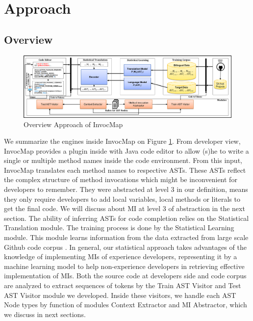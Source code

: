 \section{Approach}
\subsection{Overview}
\begin{figure}[]
 \centering
  \includegraphics[width=\linewidth]{ApproachOverview.png}
  \caption{Overview Approach of InvocMap }
  \label{fig:ApproachOverview}
\end{figure}
We summarize the engines inside InvocMap on Figure \ref{fig:ApproachOverview}. From developer view, InvocMap provides a plugin inside with Java code editor to allow (s)he to write a single or multiple method names inside the code environment. From this input, InvocMap translates each method names to respective ASTs. These ASTs reflect the complex structure of method invocations which might be inconvenient for developers to remember. They were abstracted at level 3 in our definition, means they only require developers to add local variables, local methods or literals to get the final code. We will discuss about MI at level 3 of abstraction in the next section. The ability of inferring ASTs for code completion relies on the Statistical Translation module. The training process is done by the Statistical Learning module. This module learns information from the data extracted from large scale Github code corpus  \cite{id:Github}. In general, our statistical approach takes advantages of the knowledge of implementing MIs of experience developers, representing it by a machine learning model to help non-experience developers in retrieving effective implementation of MIs. Both the source code at developers side and code corpus are analyzed to extract sequences of tokens by the Train AST Visitor and Test AST Visitor module we developed. Inside these visitors, we handle each AST Node types by function of modules Context Extractor and MI Abstractor, which we discuss in next sections.
